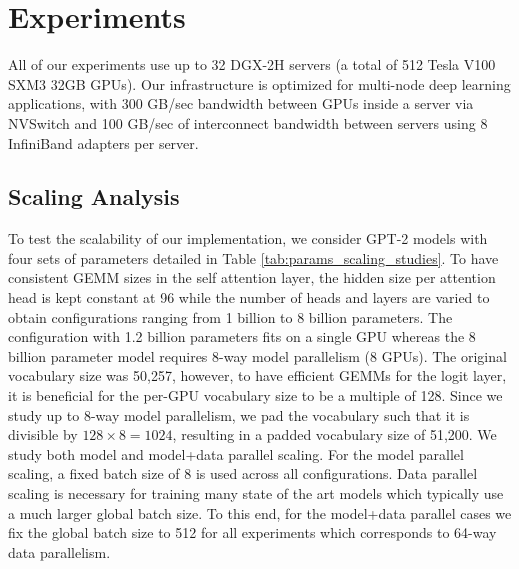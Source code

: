 \section{Experiments}

All of our experiments use up to 32 DGX-2H servers (a total of 512 Tesla V100 SXM3 32GB GPUs). Our infrastructure is optimized for multi-node deep learning applications, with 300 GB/sec bandwidth between GPUs inside a server via NVSwitch and 100 GB/sec of interconnect bandwidth between servers using 8 InfiniBand adapters per server.

\subsection{Scaling Analysis}
To test the scalability of our implementation, we consider GPT-2 models with four sets of parameters detailed in Table \ref{tab:params_scaling_studies}. To have consistent GEMM sizes in the self attention layer, the hidden size per attention head is kept constant at 96 while the number of heads and layers are varied to obtain configurations ranging from 1 billion to 8 billion parameters. The configuration with 1.2 billion parameters fits on a single GPU whereas the 8 billion parameter model requires 8-way model parallelism (8 GPUs). The original vocabulary size was 50,257, however, to have efficient GEMMs for the logit layer, it is beneficial for the per-GPU vocabulary size to be a multiple of 128. Since we study up to 8-way model parallelism, we pad the vocabulary such that it is divisible by $128\times 8=1024$, resulting in a padded vocabulary size of 51,200.  We study both model and model+data parallel scaling. For the model parallel scaling, a fixed batch size of 8 is used across all configurations. Data parallel scaling is necessary for training many state of the art models which typically use a much larger global batch size. To this end, for the model+data parallel cases we fix the global batch size to 512 for all experiments which corresponds to 64-way data parallelism. 

